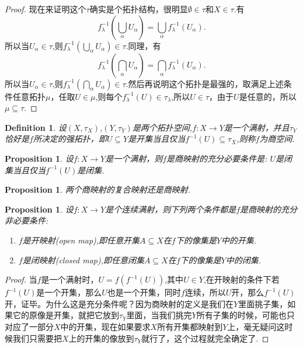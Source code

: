 \documentclass{article}
\newtheorem{proposition}[theorem]{Proposition}
\newtheorem{definition}[theorem]{Definition}
\newcommand*{\xfunc}[4]{{#2}\colon{#3}{#1}{#4}}
\newcommand*{\func}[3]{\xfunc{\to}{#1}{#2}{#3}}
\begin{document}
\begin{proof}
现在来证明这个$\tau$确实是个拓扑结构，很明显$\emptyset \in \tau$和$X \in \tau$.有\[f^{-1}_\lambda(\bigcup\limits_{\alpha} U_\alpha)=\bigcup\limits_\alpha f_\lambda^{-1}(U_\alpha).\]所以当$U_\alpha \in \tau$,则$f^{-1}_\lambda(\bigcup\limits_{\alpha} U_\alpha) \in \tau$.同理，有\[f^{-1}_\lambda(\bigcap\limits_{\alpha} U_\alpha)=\bigcap\limits_\alpha f_\lambda^{-1}(U_\alpha).\]所以当$U_\alpha \in \tau$,则$f^{-1}_\lambda(\bigcap\limits_{\alpha} U_\alpha) \in \tau$.然后再说明这个拓扑是最强的，取满足上述条件任意拓扑$\mu$，任取$U \in \mu$,则每个$f_\lambda^{-1}(U) \in \tau_\lambda$,所以$U \in \tau$，由于$U$是任意的，所以$\mu \subseteq \tau$.
\end{proof}

\begin{definition}
设$(X,\tau_X)$,$(Y,\tau_Y)$是两个拓扑空间,$\func{f}{X}{Y}$是一个满射，并且$\tau_Y$恰好是$f$所决定的强拓扑，即$U \subseteq Y$是开集当且仅当$f^{-1}(U) \subseteq \tau_X$,则称$f$为商空间.
\end{definition}

\begin{proposition}
设$\func{f}{X}{Y}$是一个满射，则$f$是商映射的充分必要条件是: $U$是闭集当且仅当$f^{-1}(U)$是闭集.
\end{proposition}

\begin{proposition}
两个商映射的复合映射还是商映射.
\end{proposition}

\begin{proposition}
设$\func{f}{X}{Y}$是个连续满射，则下列两个条件都是$f$是商映射的充分非必要条件:
\begin{enumerate}
	\item $f$是开映射(open map),即任意开集$A \subseteq X$在$f$下的像集是$Y$中的开集.
	\item $f$是闭映射(closed map),即任意闭集$A \subseteq X$在$f$下的像集是$Y$中的闭集.
\end{enumerate}
\end{proposition}

\begin{proof}
当$f$是一个满射时，$U=f(f^{-1}(U))$,其中$U \in Y$,在开映射的条件下若$f^{-1}(U)$是一个开集，那么$U$也是一个开集，同时$f$连续，所以$U$开，那么$f^{-1}(U)$开，证毕。为什么这是充分条件呢？因为商映射的定义是我们在$Y$里面挑子集，如果它的原像是开集，就把它放到$\tau_Y$里面，当我们挑完$Y$所有子集的时候，可能也只对应了一部分$X$中的开集，现在如果要求$X$所有开集都映射到$Y$上，毫无疑问这时候我们只需要把$X$上的开集的像放到$\tau_Y$就行了，这个过程就完全确定了.
\end{proof}
\end{document}
